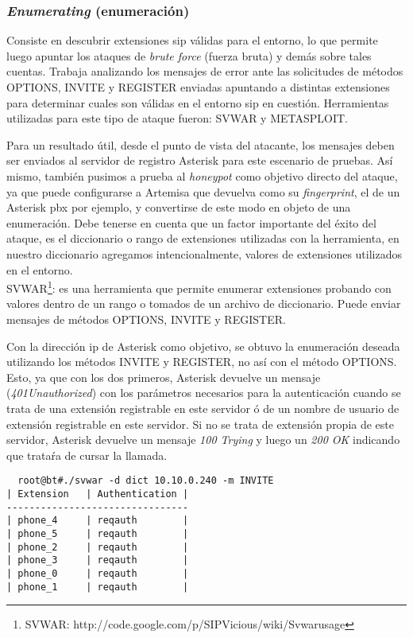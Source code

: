 \documentclass[a4paper,12pt]{report}
\newenvironment{myscriptlisting}
{\begin{list}{}{\setlength{\leftmargin}{1em}}\item\scriptsize\bfseries}
{\end{list}}
\begin{document}
\subsubsection{\emph{Enumerating} (enumeración)}

Consiste en descubrir extensiones \ac{sip} válidas para el entorno, lo que permite 
luego apuntar los ataques de \emph{brute force} (fuerza bruta) y demás sobre
tales cuentas. Trabaja analizando los mensajes de error ante las solicitudes de
métodos OPTIONS, INVITE y REGISTER enviadas apuntando a distintas extensiones
para determinar cuales son válidas en el entorno \ac{sip} en cuestión. 
Herramientas utilizadas para este tipo de ataque fueron: SVWAR y METASPLOIT. 

Para un resultado útil, desde el punto de vista del atacante, los mensajes deben
 ser enviados al servidor de registro Asterisk para este escenario de pruebas.
Así mismo, también pusimos a prueba al \emph{honeypot} como objetivo directo del ataque,
ya que puede configurarse a Artemisa que devuelva como su \emph{fingerprint}, el
de un Asterisk \ac{pbx} por ejemplo, y convertirse de este modo en objeto de una
enumeración.
 Debe tenerse en cuenta que un factor importante del éxito del ataque, es el 
diccionario o rango de extensiones utilizadas con la herramienta, en nuestro
diccionario agregamos intencionalmente, valores de extensiones utilizados en el entorno.\\

SVWAR\footnote{SVWAR:
http://code.google.com/p/SIPVicious/wiki/Svwarusage}: es una herramienta que permite enumerar extensiones probando con valores
dentro de un rango o tomados de un archivo de diccionario. Puede enviar mensajes de
métodos OPTIONS, INVITE y REGISTER. 


Con la dirección \ac{ip} de Asterisk como objetivo, se obtuvo la enumeración deseada
utilizando los métodos INVITE y REGISTER, no así con el método OPTIONS. Esto, 
ya que con los dos primeros, Asterisk devuelve un mensaje (\emph{401Unauthorized}) con los
parámetros necesarios para la autenticación cuando se trata de una extensión registrable en
este servidor ó de un nombre de usuario de extensión registrable en este
servidor. Si no se trata de extensión propia
de este servidor, Asterisk devuelve un mensaje \emph{100 Trying} y luego un
\emph{200 OK} indicando que trataŕa de cursar la llamada. 

\begin{myscriptlisting}
 \begin{verbatim}
  root@bt#./svwar -d dict 10.10.0.240 -m INVITE 
| Extension   | Authentication |
--------------------------------
| phone_4     | reqauth        |
| phone_5     | reqauth        |
| phone_2     | reqauth        |
| phone_3     | reqauth        |
| phone_0     | reqauth        |
| phone_1     | reqauth        |

 \end{verbatim}

\end{myscriptlisting}
\end{document}
